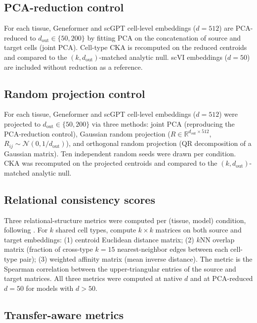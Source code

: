 \documentclass[11pt]{article}
\newcommand{\R}{\mathbb{R}}
\begin{document}
\subsection{PCA-reduction control}

For each tissue, Geneformer and scGPT cell-level embeddings ($d = 512$)
are PCA-reduced to $d_{\mathrm{out}} \in \{50, 200\}$ by fitting PCA on
the concatenation of source and target cells (joint PCA). Cell-type CKA
is recomputed on the reduced centroids and compared to the
$(k, d_{\mathrm{out}})$-matched analytic null. scVI embeddings
($d = 50$) are included without reduction as a reference.

\subsection{Random projection control}
\label{sec:randprojmethod}

For each tissue, Geneformer and scGPT cell-level embeddings ($d = 512$)
were projected to $d_{\mathrm{out}} \in \{50, 200\}$ via three methods:
joint PCA (reproducing the PCA-reduction control), Gaussian random
projection ($R \in \R^{d_{\mathrm{out}} \times 512}$,
$R_{ij} \sim \mathcal{N}(0, 1/d_{\mathrm{out}})$), and orthogonal
random projection (QR decomposition of a Gaussian matrix). Ten
independent random seeds were drawn per condition. CKA was recomputed on
the projected centroids and compared to the
$(k, d_{\mathrm{out}})$-matched analytic null.

\subsection{Relational consistency scores}
\label{sec:scgraphmethod}

Three relational-structure metrics were computed per (tissue, model)
condition, following \citet{wang2026scgraph}. For $k$ shared cell types,
compute $k \times k$ matrices on both source and target embeddings: (1)
centroid Euclidean distance matrix; (2) $k$NN overlap matrix (fraction
of cross-type $k = 15$ nearest-neighbor edges between each cell-type
pair); (3) weighted affinity matrix (mean inverse distance). The metric
is the Spearman correlation between the upper-triangular entries of the
source and target matrices. All three metrics were computed at native $d$
and at PCA-reduced $d = 50$ for models with $d > 50$.

\subsection{Transfer-aware metrics}
\label{sec:sccmethod}
\end{document}
